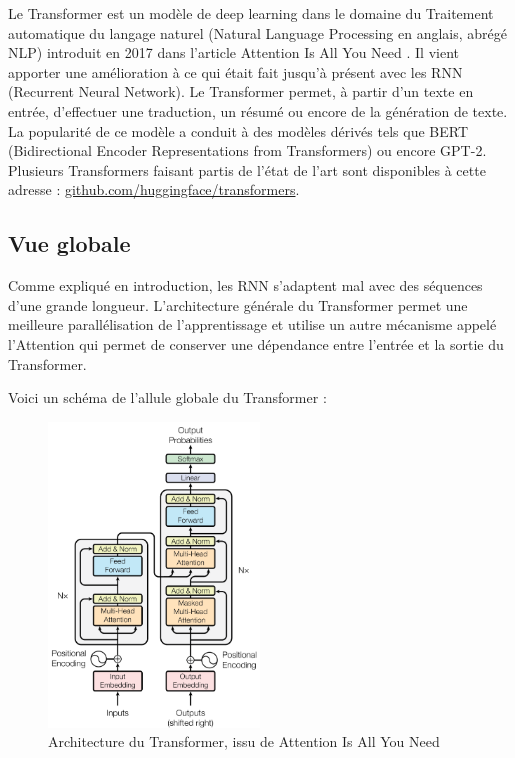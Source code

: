 Le \og Transformer \fg{} est un modèle de deep learning dans le domaine du Traitement automatique du langage naturel (Natural Language Processing en anglais, abrégé NLP)
introduit en 2017 dans l'article \og Attention Is All You Need \fg{}\cite{vaswani2017attention}.
Il vient apporter une amélioration à ce qui était fait jusqu'à présent avec les RNN (Recurrent Neural Network).
Le Transformer permet, à partir d'un texte en entrée, d'effectuer une traduction, un résumé ou encore de la génération de texte. \\

La popularité de ce modèle a conduit à des modèles dérivés tels que
BERT (Bidirectional Encoder Representations from Transformers)\cite{devlin2018bert} ou encore GPT-2\cite{radford2019gpt2}.
Plusieurs Transformers faisant partis de l'état de l'art sont disponibles à cette adresse : \href{https://github.com/huggingface/transformers}{github.com/huggingface/transformers}.

\subsection{Vue globale}

Comme expliqué en introduction, les RNN s'adaptent mal avec des séquences d'une grande longueur.
L'architecture générale du Transformer permet une meilleure parallélisation de l'apprentissage et utilise un autre mécanisme appelé \og l'Attention \fg{} qui permet
de conserver une dépendance entre l'entrée et la sortie du Transformer.

Voici un schéma de l'allule globale du Transformer :
\begin{figure}[h]
  \begin{center}
  \includegraphics[width=0.5\textwidth]{img/architecture_transformer.png}
  \end{center}
  \caption{Architecture du Transformer, issu de \og Attention Is All You Need \fg{}\cite{vaswani2017attention}}
  \label{fig:transformer}
\end{figure}


